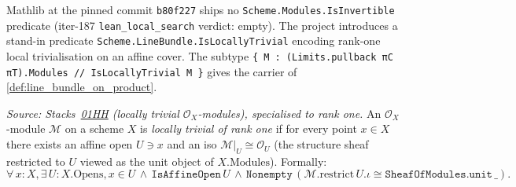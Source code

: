 Mathlib at the pinned commit \texttt{b80f227} ships no
\texttt{Scheme.Modules.IsInvertible} predicate (iter-187 \texttt{lean\_local\_search}
verdict: empty). The project introduces a stand-in predicate
\texttt{Scheme.LineBundle.IsLocallyTrivial} encoding rank-one local
trivialisation on an affine cover. The subtype
\texttt{\{ M : (Limits.pullback πC πT).Modules // IsLocallyTrivial M \}}
gives the carrier of \cref{def:line_bundle_on_product}.

\begin{definition}

  \label{def:IsLocallyTrivial}
  \textit{Source: Stacks~\href{https://stacks.math.columbia.edu/tag/01HH}{01HH}
  (locally trivial $\mathcal{O}_X$-modules), specialised to rank one.}
  An \(\mathcal{O}_X\)-module \(\mathcal{M}\) on a scheme \(X\) is
  \emph{locally trivial of rank one} if for every point \(x \in X\) there
  exists an affine open \(U \ni x\) and an iso
  \(\mathcal{M}|_U \cong \mathcal{O}_U\) (the structure sheaf restricted to
  \(U\) viewed as the unit object of \(X.\mathrm{Modules}\)). Formally:
  \[
    \forall\, x : X, \exists\, U : X.\mathrm{Opens},
      x \in U \,\wedge\, \mathtt{IsAffineOpen}\, U \,\wedge\,
      \mathtt{Nonempty}\, (\mathcal{M}.\mathrm{restrict}\, U.\iota \cong
        \mathtt{SheafOfModules.unit}\, \_).
  \]
\end{definition}

